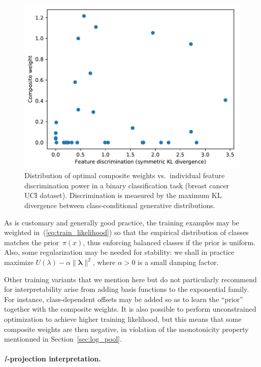 \documentclass[english]{scrartcl}
\newcommand{\blambda}{{\boldsymbol{\lambda}}}
\begin{document}
\begin{figure}[!ht]
  \begin{center}
    \includegraphics[width=.7\textwidth]{disc_weight_plot.pdf}
  \end{center}
\caption{Distribution of optimal composite weights vs.~individual feature discrimination power in a binary classification task (breast cancer UCI dataset). Discrimination is measured by the maximum KL divergence between class-conditional generative distributions.}
\label{fig:disc_weight_plot}
\end{figure}

As is customary and generally good practice, the training examples may be weighted in~(\ref{eq:train_likelihood}) so that the empirical distribution of classes matches the prior~$\pi(x)$, thus enforcing balanced classes if the prior is uniform. Also, some regularization may be needed for stability: we shall in practice maximize $U(\lambda)-\alpha \|\blambda\|^2$, where $\alpha>0$ is a small damping factor.

Other training variants that we mention here but do not particularly recommend for interpretability arise from adding basis functions to the exponential family. For instance, class-dependent offsets may be added so as to learn the ``prior'' together with the composite weights. It is also possible to perform unconstrained optimization to achieve higher training likelihood, but this means that some composite weights are then negative, in violation of the monotonicity property mentionned in Section~\ref{sec:log_pool}.


\paragraph{$I$-projection interpretation.}
\end{document}
